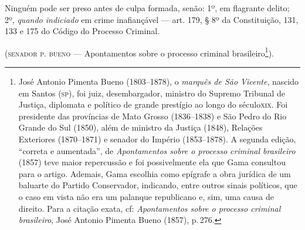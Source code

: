 Ninguém pode ser preso antes de culpa formada, senão: 1º, em flagrante
delito; 2º, \emph{quando indiciado} em crime inafiançável --- art. 179, §
8º da Constituição, 131, 133 e 175 do Código do
Processo Criminal.

(\textsc{senador p. bueno} --- Apontamentos sobre o processo criminal
brasileiro\footnote{ José Antonio Pimenta Bueno (1803--1878), o
  \emph{marquês de São Vicente}, nascido em Santos (\textsc{sp}), foi juiz,
  desembargador, ministro do Supremo Tribunal de Justiça, diplomata e
  político de grande prestígio ao longo do século\textsc{xix}. Foi presidente
  das províncias de Mato Grosso (1836--1838) e São Pedro do Rio Grande do
  Sul (1850), além de ministro da Justiça (1848), Relações Exteriores
  (1870--1871) e senador do Império (1853--1878). A segunda edição,
  ``correta e aumentada'', de \emph{Apontamentos sobre o processo criminal
  brasileiro} (1857) teve maior repercussão e foi possivelmente ela que
  Gama consultou para o artigo. Ademais, Gama escolhia como epígrafe a
  obra jurídica de um baluarte do Partido Conservador, indicando, entre
  outros sinais políticos, que o caso em vista não era um palanque
  republicano e, sim, uma causa de direito. Para a citação exata, cf:
  \emph{Apontamentos sobre o processo criminal brasileiro}, José Antonio
  Pimenta Bueno (1857), p.\,276.}).

